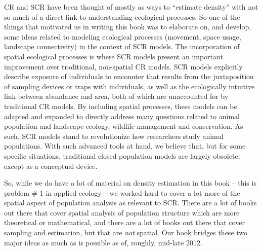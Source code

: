 
CR and SCR have been thought of mostly as ways to ``estimate density''
with not so much of a direct link to understanding ecological
processes. So one of the things that motivated us in writing this book was to elaborate on,
and develop, some ideas related to modeling ecological processes
(movement, space usage, landscape connectivity) in the context of SCR
models.  The incorporation of spatial ecological processes is where SCR models present an important improvement
over traditional, non-spatial CR models.  SCR models explicitly
describe exposure of individuals to encounter 
that results from the
juxtaposition of sampling devices or traps with individuals, as well
as the ecologically intuitive link between abundance and area, both of
which are unaccounted for by traditional CR models. By including
spatial processes, these models can be adapted and expanded to
directly address many questions related to animal population and
landscape ecology, wildlife management and conservation.  As such, SCR
models 
stand to revolutionize how researchers study animal populations.  With
such advanced tools at hand, we believe that, but for some specific
situations, traditional closed population models are largely obsolete,
except as a conceptual device.

So, while we do have a lot of material on density estimation in this
book -- this is problem \# 1 in applied ecology -- we worked hard to
cover a lot more of the spatial aspect of population analysis as
relevant to SCR.  There are a lot of books out there that cover
spatial analysis of population structure which are more theoretical or
mathematical, and there are a lot of books out there that cover
sampling and estimation, but that are {\it not} spatial. Our book
bridges these two major ideas as much as is possible as of, roughly,
mid-late 2012.

